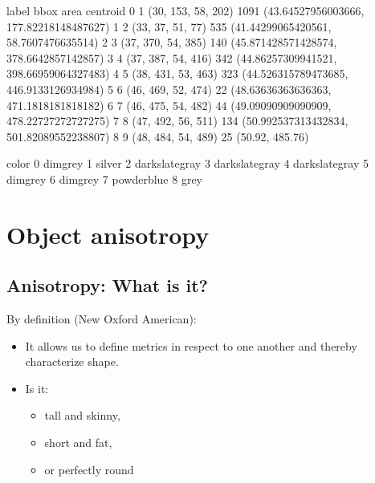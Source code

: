\documentclass[letterpaper,10pt,english]{sphinxmanual}
\begin{document}
\begin{sphinxVerbatim}[commandchars=\\\{\}]
   label                bbox  area                                  centroid  \PYGZbs{}
0      1  (30, 153, 58, 202)  1091   (43.64527956003666, 177.82218148487627)   
1      2    (33, 37, 51, 77)   535     (41.44299065420561, 58.7607476635514)   
2      3  (37, 370, 54, 385)   140   (45.871428571428574, 378.6642857142857)   
3      4  (37, 387, 54, 416)   342   (44.86257309941521, 398.66959064327483)   
4      5  (38, 431, 53, 463)   323   (44.526315789473685, 446.9133126934984)   
5      6  (46, 469, 52, 474)    22    (48.63636363636363, 471.1818181818182)   
6      7  (46, 475, 54, 482)    44   (49.09090909090909, 478.22727272727275)   
7      8  (47, 492, 56, 511)   134  (50.992537313432834, 501.82089552238807)   
8      9  (48, 484, 54, 489)    25                           (50.92, 485.76)   

           color  
0        dimgrey  
1         silver  
2  darkslategray  
3  darkslategray  
4  darkslategray  
5        dimgrey  
6        dimgrey  
7     powderblue  
8           grey  
\end{sphinxVerbatim}

\noindent{}


\chapter{Object anisotropy}
\label{\detokenize{06-ShapeAnalysis:object-anisotropy}}

\section{Anisotropy: What is it?}
\label{\detokenize{06-ShapeAnalysis:anisotropy-what-is-it}}
\sphinxAtStartPar
By definition (New Oxford American): 
\begin{itemize}
\item {} 
\sphinxAtStartPar
It allows us to define metrics in respect to one another and thereby characterize shape.

\item {} 
\sphinxAtStartPar
Is it:
\begin{itemize}
\item {} 
\sphinxAtStartPar
tall and skinny,

\item {} 
\sphinxAtStartPar
short and fat,

\item {} 
\sphinxAtStartPar
or perfectly round

\end{itemize}

\end{itemize}
\end{document}
